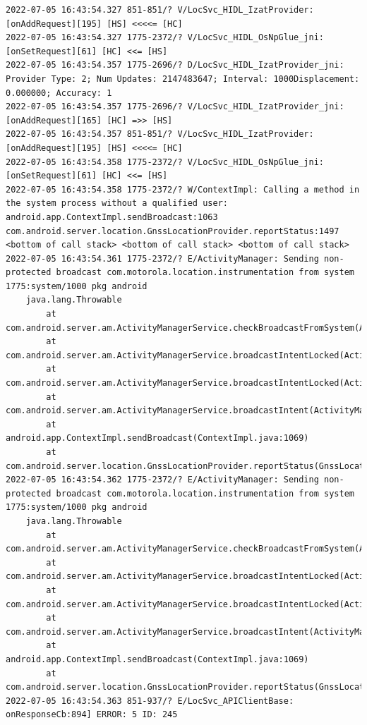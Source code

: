 \documentclass[a4paper,12pt]{book}
\begin{document}
\begin{lstlisting}
2022-07-05 16:43:54.327 851-851/? V/LocSvc_HIDL_IzatProvider: [onAddRequest][195] [HS] <<<<= [HC]
2022-07-05 16:43:54.327 1775-2372/? V/LocSvc_HIDL_OsNpGlue_jni: [onSetRequest][61] [HC] <<= [HS]
2022-07-05 16:43:54.357 1775-2696/? D/LocSvc_HIDL_IzatProvider_jni: Provider Type: 2; Num Updates: 2147483647; Interval: 1000Displacement: 0.000000; Accuracy: 1
2022-07-05 16:43:54.357 1775-2696/? V/LocSvc_HIDL_IzatProvider_jni: [onAddRequest][165] [HC] =>> [HS]
2022-07-05 16:43:54.357 851-851/? V/LocSvc_HIDL_IzatProvider: [onAddRequest][195] [HS] <<<<= [HC]
2022-07-05 16:43:54.358 1775-2372/? V/LocSvc_HIDL_OsNpGlue_jni: [onSetRequest][61] [HC] <<= [HS]
2022-07-05 16:43:54.358 1775-2372/? W/ContextImpl: Calling a method in the system process without a qualified user: android.app.ContextImpl.sendBroadcast:1063 com.android.server.location.GnssLocationProvider.reportStatus:1497 <bottom of call stack> <bottom of call stack> <bottom of call stack> 
2022-07-05 16:43:54.361 1775-2372/? E/ActivityManager: Sending non-protected broadcast com.motorola.location.instrumentation from system 1775:system/1000 pkg android
    java.lang.Throwable
        at com.android.server.am.ActivityManagerService.checkBroadcastFromSystem(ActivityManagerService.java:15425)
        at com.android.server.am.ActivityManagerService.broadcastIntentLocked(ActivityManagerService.java:15979)
        at com.android.server.am.ActivityManagerService.broadcastIntentLocked(ActivityManagerService.java:15442)
        at com.android.server.am.ActivityManagerService.broadcastIntent(ActivityManagerService.java:16227)
        at android.app.ContextImpl.sendBroadcast(ContextImpl.java:1069)
        at com.android.server.location.GnssLocationProvider.reportStatus(GnssLocationProvider.java:1497)
2022-07-05 16:43:54.362 1775-2372/? E/ActivityManager: Sending non-protected broadcast com.motorola.location.instrumentation from system 1775:system/1000 pkg android
    java.lang.Throwable
        at com.android.server.am.ActivityManagerService.checkBroadcastFromSystem(ActivityManagerService.java:15425)
        at com.android.server.am.ActivityManagerService.broadcastIntentLocked(ActivityManagerService.java:16073)
        at com.android.server.am.ActivityManagerService.broadcastIntentLocked(ActivityManagerService.java:15442)
        at com.android.server.am.ActivityManagerService.broadcastIntent(ActivityManagerService.java:16227)
        at android.app.ContextImpl.sendBroadcast(ContextImpl.java:1069)
        at com.android.server.location.GnssLocationProvider.reportStatus(GnssLocationProvider.java:1497)
2022-07-05 16:43:54.363 851-937/? E/LocSvc_APIClientBase: onResponseCb:894] ERROR: 5 ID: 245

\end{lstlisting}
\end{document}
